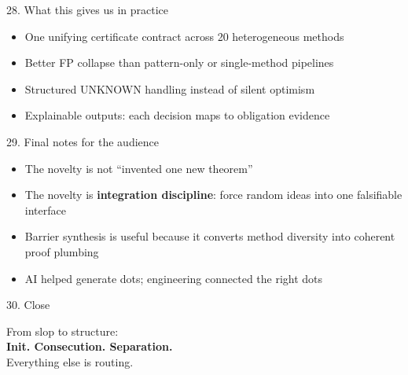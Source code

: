 \documentclass[aspectratio=169]{beamer}
\begin{document}
\begin{frame}{28. What this gives us in practice}
\begin{itemize}
  \item One unifying certificate contract across 20 heterogeneous methods
  \item Better FP collapse than pattern-only or single-method pipelines
  \item Structured UNKNOWN handling instead of silent optimism
  \item Explainable outputs: each decision maps to obligation evidence
\end{itemize}
\end{frame}

\begin{frame}{29. Final notes for the audience}
\begin{itemize}
  \item The novelty is not ``invented one new theorem''
  \item The novelty is \textbf{integration discipline}: force random ideas into one falsifiable interface
  \item Barrier synthesis is useful because it converts method diversity into coherent proof plumbing
  \item AI helped generate dots; engineering connected the right dots
\end{itemize}
\end{frame}

\begin{frame}{30. Close}
\begin{center}
\Large
From slop to structure:\\
\vspace{0.3em}
\textbf{Init. Consecution. Separation.}\\
\vspace{0.6em}
\normalsize
Everything else is routing.
\end{center}
\end{frame}
\end{document}

